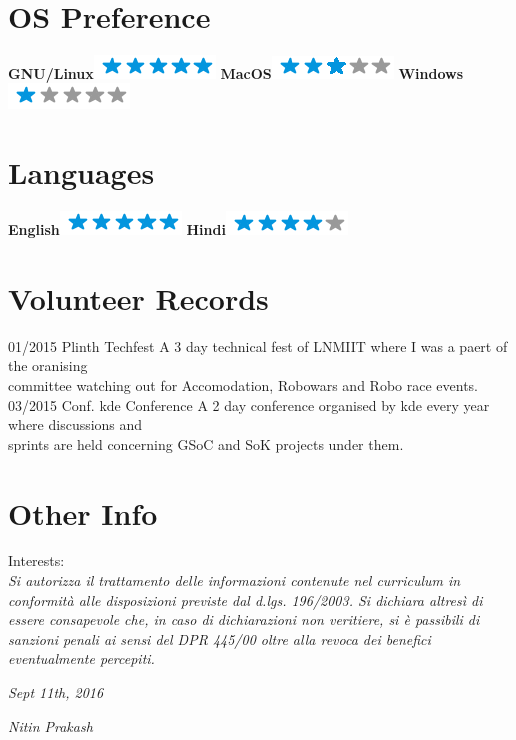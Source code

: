 \documentclass[]{friggeri-cv}
\begin{document}
\newpage

\begin{aside}
~
~
~
  \section{OS Preference}
    \textbf{GNU/Linux}\includegraphics[scale=0.40]{img/5stars.png}
    \textbf{MacOS}\includegraphics[scale=0.40]{img/3stars.png}
    \textbf{Windows}\includegraphics[scale=0.40]{img/1stars.png}
    ~
  \section{Languages}
    \textbf{English}\includegraphics[scale=0.40]{img/5stars.png}
    \textbf{Hindi}\includegraphics[scale=0.40]{img/4stars.png}
    ~
\end{aside}

\section{Volunteer Records}
\begin{entrylist}
  \entry
    {01/2015}
    {Plinth}
    {Techfest}
    {A 3 day technical fest of LNMIIT where I was a paert of the oranising \\committee watching out for Accomodation, Robowars and Robo race events.\\}
  \entry
    {03/2015}
    {Conf. kde}
    {Conference}
    {A 2 day conference organised by kde every year where discussions and \\sprints are held concerning GSoC and SoK projects under them.\\}
\end{entrylist}


\section{Other Info}
Interests:\\
\emph{Si autorizza il trattamento delle informazioni contenute nel curriculum in conformità alle disposizioni previste dal d.lgs. 196/2003. Si dichiara altresì di essere consapevole che, in caso di dichiarazioni non veritiere, si è passibili di sanzioni penali ai sensi del DPR 445/00 oltre alla revoca dei benefici eventualmente percepiti.}
\\
\begin{flushleft}
\emph{Sept 11th, 2016}
\end{flushleft}
\begin{flushright}
\emph{Nitin Prakash}
\end{flushright}
\end{document}
